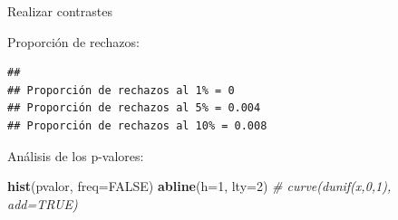 \documentclass[
]{book}
\newenvironment{Shaded}{\begin{snugshade}}{\end{snugshade}}
\newcommand{\CharTok}[1]{\textcolor[rgb]{0.31,0.60,0.02}{#1}}
\newcommand{\CommentTok}[1]{\textcolor[rgb]{0.56,0.35,0.01}{\textit{#1}}}
\newcommand{\ControlFlowTok}[1]{\textcolor[rgb]{0.13,0.29,0.53}{\textbf{#1}}}
\newcommand{\DataTypeTok}[1]{\textcolor[rgb]{0.13,0.29,0.53}{#1}}
\newcommand{\DecValTok}[1]{\textcolor[rgb]{0.00,0.00,0.81}{#1}}
\newcommand{\FloatTok}[1]{\textcolor[rgb]{0.00,0.00,0.81}{#1}}
\newcommand{\KeywordTok}[1]{\textcolor[rgb]{0.13,0.29,0.53}{\textbf{#1}}}
\newcommand{\NormalTok}[1]{#1}
\newcommand{\OperatorTok}[1]{\textcolor[rgb]{0.81,0.36,0.00}{\textbf{#1}}}
\newcommand{\OtherTok}[1]{\textcolor[rgb]{0.56,0.35,0.01}{#1}}
\newcommand{\StringTok}[1]{\textcolor[rgb]{0.31,0.60,0.02}{#1}}
\theoremstyle{break}
\theoremstyle{definition}
\theoremstyle{definition}
\theoremstyle{definition}
\theoremstyle{remark}
\begin{document}
\begin{enumerate}
  Realizar contrastes

\begin{Shaded}
\end{Shaded}

  Proporción de rechazos:

\begin{Shaded}
\end{Shaded}

\begin{verbatim}
## 
## Proporción de rechazos al 1% = 0 
## Proporción de rechazos al 5% = 0.004 
## Proporción de rechazos al 10% = 0.008
\end{verbatim}

  Análisis de los p-valores:

\begin{Shaded}
\begin{Highlighting}[]
\KeywordTok{hist}\NormalTok{(pvalor, }\DataTypeTok{freq=}\OtherTok{FALSE}\NormalTok{)}
\KeywordTok{abline}\NormalTok{(}\DataTypeTok{h=}\DecValTok{1}\NormalTok{, }\DataTypeTok{lty=}\DecValTok{2}\NormalTok{)   }\CommentTok{# curve(dunif(x,0,1), add=TRUE)}
\end{Highlighting}
\end{Shaded}


\end{enumerate}
\end{document}
